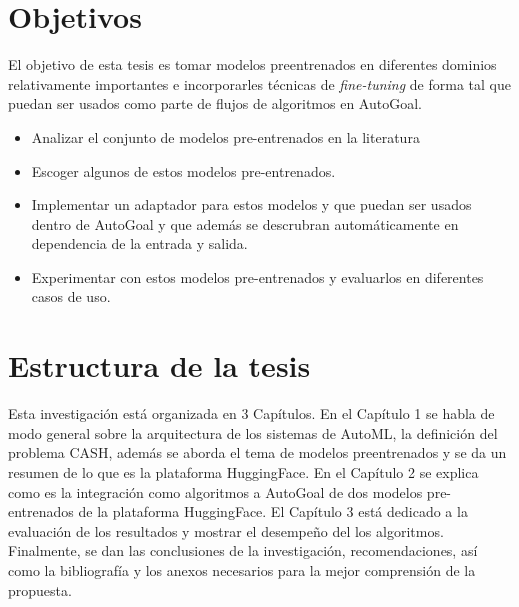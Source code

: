 \section*{Objetivos}
El objetivo de esta tesis es tomar modelos preentrenados en diferentes dominios relativamente importantes e incorporarles técnicas de \textit{fine-tuning} de forma tal que puedan ser usados como parte de flujos de algoritmos en AutoGoal.\\

\begin{itemize}

\item Analizar el conjunto de modelos pre-entrenados en la literatura
\item Escoger algunos de estos modelos pre-entrenados.
\item Implementar un adaptador para estos modelos y que puedan ser usados dentro de AutoGoal y que además se descrubran automáticamente en dependencia de la entrada y salida.
\item Experimentar con estos modelos pre-entrenados y evaluarlos en diferentes casos de uso.

\end{itemize}

\section*{Estructura de la tesis}
Esta investigación está organizada en 3 Capítulos. En el Capítulo 1 se habla de modo general sobre la arquitectura de los sistemas de AutoML, la definición del problema CASH, además se aborda el tema de modelos preentrenados y se da un resumen de lo que es la plataforma HuggingFace. En el Capítulo 2 se explica como es la integración como algoritmos a AutoGoal de dos modelos pre-entrenados de la plataforma HuggingFace. El Capítulo 3 está dedicado a la evaluación de los resultados y mostrar el desempeño del los algoritmos. Finalmente, se dan las conclusiones de la investigación, recomendaciones, así como la bibliografía y los anexos necesarios para la mejor comprensión de la propuesta.

